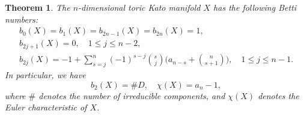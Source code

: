\documentclass[JEP,XML,SOM,Unicode,NoFloatCountersInSection]{cedram}
\newtheorem{theorem}{Theorem}[section]
\theoremstyle{definition}
\let\sharp\#
\begin{document}
\begin{theorem}\label{bettith}
The $n$-dimensional toric Kato manifold $X$ has the following Betti numbers:
\begin{gather*}
b_0(X)=b_1(X)=b_{2n-1}(X)=b_{2n}(X)=1,\\
b_{2j+1}(X)=0, \quad 1\leq j\leq n-2,\\
b_{2j}(X)=-1+\sum_{s=j}^n(-1)^{s-j}\binom{s}{j}\biggl(a_{n-s}+\binom{n}{s+1}\biggr), \quad 1\leq j\leq n-1.
\end{gather*}
In particular, we have
\begin{equation*}
b_2(X)=\sharp D, \quad \chi(X)=a_n-1,
\end{equation*}
where $\sharp$ denotes the number of irreducible components, and $\chi(X)$ denotes the Euler characteristic of $X$.
\end{theorem}
\end{document}
